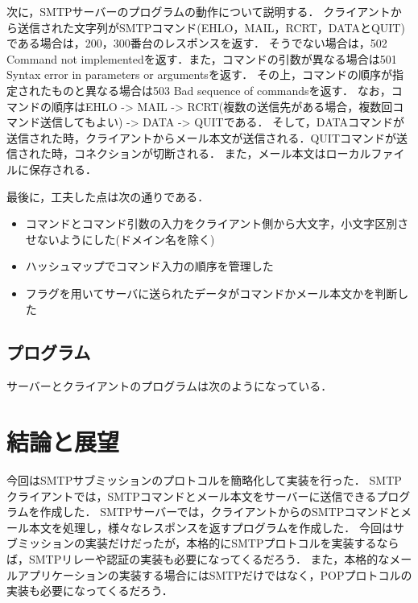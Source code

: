 \documentclass[dvipdfmx,a4paper]{jsarticle}
\theoremstyle{definition}
\begin{document}
次に，SMTPサーバーのプログラムの動作について説明する．
クライアントから送信された文字列がSMTPコマンド(EHLO，MAIL，RCRT，DATAとQUIT)である場合は，200，300番台のレスポンスを返す．
そうでない場合は，502  Command not implementedを返す．また，コマンドの引数が異なる場合は501  Syntax error in parameters or argumentsを返す．
その上，コマンドの順序が指定されたものと異なる場合は503  Bad sequence of commandsを返す．
なお，コマンドの順序はEHLO -> MAIL -> RCRT(複数の送信先がある場合，複数回コマンド送信してもよい) -> DATA -> QUITである．
そして，DATAコマンドが送信された時，クライアントからメール本文が送信される．QUITコマンドが送信された時，コネクションが切断される．
また，メール本文はローカルファイルに保存される．




最後に，工夫した点は次の通りである．
\begin{itemize}
  \item コマンドとコマンド引数の入力をクライアント側から大文字，小文字区別させないようにした(ドメイン名を除く)
  \item ハッシュマップでコマンド入力の順序を管理した
  \item フラグを用いてサーバに送られたデータがコマンドかメール本文かを判断した
\end{itemize}
\subsection{プログラム}
サーバーとクライアントのプログラムは次のようになっている．





\section{結論と展望}
今回はSMTPサブミッションのプロトコルを簡略化して実装を行った．
SMTPクライアントでは，SMTPコマンドとメール本文をサーバーに送信できるプログラムを作成した．
SMTPサーバーでは，クライアントからのSMTPコマンドとメール本文を処理し，様々なレスポンスを返すプログラムを作成した．
今回はサブミッションの実装だけだったが，本格的にSMTPプロトコルを実装するならば，SMTPリレーや認証の実装も必要になってくるだろう．
また，本格的なメールアプリケーションの実装する場合にはSMTPだけではなく，POPプロトコルの実装も必要になってくるだろう．
\end{document}
